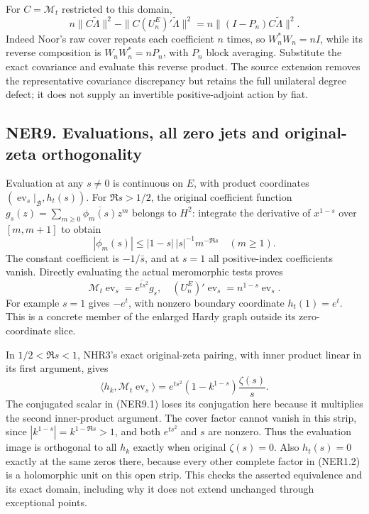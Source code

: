 For \(C=\mathcal M_t\) restricted to this domain, \[
n\|C\widetilde\Lambda\|^2-
\|C(U_n^E)'\widetilde\Lambda\|^2
=n\|(I-P_n)C\widetilde\Lambda\|^2.
\tag{NER8.2}
\] Indeed Noor's raw cover repeats each coefficient \(n\) times, so
\(W_n^*W_n=nI\), while its reverse composition is \(W_nW_n^*=nP_n\),
with \(P_n\) block averaging. Substitute the exact covariance and
evaluate this reverse product. The source extension removes the
representative covariance discrepancy but retains the full unilateral
degree defect; it does not supply an invertible positive-adjoint action
by fiat.

\subsection{NER9. Evaluations, all zero jets and original-zeta
orthogonality}\label{ner9.-evaluations-all-zero-jets-and-original-zeta-orthogonality}

Evaluation at any \(s\ne0\) is continuous on \(E\), with product
coordinates \((\operatorname{ev}_s|_{\mathcal B},h_t(s))\). For
\(\Re s>1/2\), the original coefficient function
\(g_s(z)=\sum_{m\ge0}\overline{\phi_m(s)}z^m\) belongs to \(H^2\):
integrate the derivative of \(x^{1-s}\) over \([m,m+1]\) to obtain \[
|\phi_m(s)|\le |1-s|\,|s|^{-1}m^{-\Re s}\quad(m\ge1).
\] The constant coefficient is \(-1/\bar s\), and at \(s=1\) all
positive-index coefficients vanish. Directly evaluating the actual
meromorphic tests proves \[
\mathcal M_t\operatorname{ev}_s=\overline{e^{ts^2}}g_s,
\quad (U_n^E)'\operatorname{ev}_s=n^{1-s}\operatorname{ev}_s.
\tag{NER9.1}
\] For example \(s=1\) gives \(-e^t\), with nonzero boundary coordinate
\(h_t(1)=e^t\). This is a concrete member of the enlarged Hardy graph
outside its zero-coordinate slice.

In \(1/2<\Re s<1\), NHR3's exact original-zeta pairing, with inner
product linear in its first argument, gives \[
\langle h_k,\mathcal M_t\operatorname{ev}_s\rangle
=e^{ts^2}(1-k^{1-s})\frac{\zeta(s)}s.
\tag{NER9.2}
\] The conjugated scalar in (NER9.1) loses its conjugation here because
it multiplies the second inner-product argument. The cover factor cannot
vanish in this strip, since \(|k^{1-s}|=k^{1-\Re s}>1\), and both
\(e^{ts^2}\) and \(s\) are nonzero. Thus the evaluation image is
orthogonal to all \(h_k\) exactly when original \(\zeta(s)=0\). Also
\(h_t(s)=0\) exactly at the same zeros there, because every other
complete factor in (NER1.2) is a holomorphic unit on this open strip.
This checks the asserted equivalence and its exact domain, including why
it does not extend unchanged through exceptional points.


